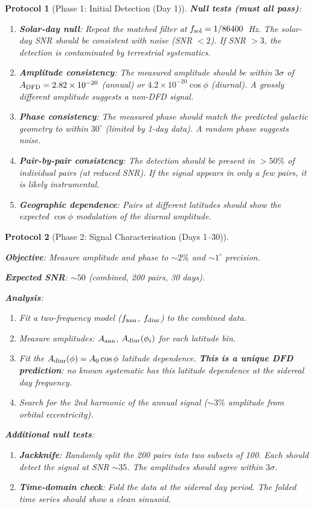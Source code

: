 \documentclass[11pt]{article}
\newtheorem{protocol}{Protocol}
\newcommand{\ee}[1]{\times 10^{#1}}
\begin{document}
\begin{protocol}[Phase 1: Initial Detection (Day 1)]
\textbf{Null tests (must all pass)}:
\begin{enumerate}[nosep]
\item \textbf{Solar-day null}: Repeat the matched filter at $f_{\rm sol}
  = 1/86400$~Hz. The solar-day SNR should be \emph{consistent with noise}
  (SNR $< 2$). If SNR $> 3$, the detection is contaminated by terrestrial
  systematics.
\item \textbf{Amplitude consistency}: The measured amplitude should be
  within $3\sigma$ of $A_{\rm DFD} = 2.82\ee{-20}$ (annual) or
  $4.2\ee{-20}\cos\phi$ (diurnal). A grossly different amplitude
  suggests a non-DFD signal.
\item \textbf{Phase consistency}: The measured phase should match the
  predicted galactic geometry to within $30^\circ$ (limited by 1-day
  data). A random phase suggests noise.
\item \textbf{Pair-by-pair consistency}: The detection should be present
  in $> 50\%$ of individual pairs (at reduced SNR). If the signal appears
  in only a few pairs, it is likely instrumental.
\item \textbf{Geographic dependence}: Pairs at different latitudes should
  show the expected $\cos\phi$ modulation of the diurnal amplitude.
\end{enumerate}
\end{protocol}

\begin{protocol}[Phase 2: Signal Characterisation (Days 1--30)]
\label{prot:phase2}
\mbox{}

\textbf{Objective}: Measure amplitude and phase to $\sim 2\%$ and
$\sim 1^\circ$ precision.

\textbf{Expected SNR}: $\sim 50$ (combined, 200 pairs, 30 days).

\textbf{Analysis}:
\begin{enumerate}[nosep]
\item Fit a two-frequency model ($f_{\rm ann}$, $f_{\rm diur}$) to the
  combined data.
\item Measure amplitudes: $A_{\rm ann}$, $A_{\rm diur}(\phi_i)$ for
  each latitude bin.
\item Fit the $A_{\rm diur}(\phi) = A_0\cos\phi$ latitude dependence.
  \textbf{This is a unique DFD prediction}: no known systematic has
  this latitude dependence at the sidereal day frequency.
\item Search for the 2nd harmonic of the annual signal ($\sim 3\%$
  amplitude from orbital eccentricity).
\end{enumerate}

\textbf{Additional null tests}:
\begin{enumerate}[nosep]
\item \textbf{Jackknife}: Randomly split the 200 pairs into two
  subsets of 100. Each should detect the signal at SNR $\sim 35$.
  The amplitudes should agree within $3\sigma$.
\item \textbf{Time-domain check}: Fold the data at the sidereal day
  period. The folded time series should show a clean sinusoid.
\end{enumerate}
\end{protocol}
\end{document}
